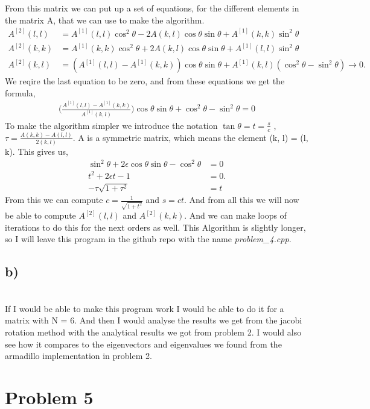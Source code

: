 \documentclass[english,notitlepage]{revtex4-1}  %
\begin{document}
From this matrix we can put up a set of equations, for the different elements in the matrix A, that we can use to make the algorithm.
\begin{align}
A^{[2]}(l, l) &= A^{[1]}(l, l) \cos^2 \theta - 2 A(k, l) \cos \theta \sin \theta + A^{[1]}(k, k) \sin^2 \theta \\
A^{[2]}(k, k) &= A^{[1]}(k, k) \cos^2 \theta + 2 A(k, l) \cos \theta \sin \theta + A^{[1]}(l, l) \sin^2 \theta \\
A^{[2]}(k, l) &= (A^{[1]}(l, l) - A^{[1]}(k, k))\cos \theta \sin \theta + A^{[1]}(k, l)(\cos^2 \theta - \sin^2 \theta) \rightarrow 0.
\end{align}
We reqire the last equation to be zero, and from these equations we get the formula, 
\begin{align}
\bigg( \frac{A^{[1]}(l, l) - A^{[1]}(k, k)}{A^{[1]}(k, l)} \bigg)\cos \theta \sin \theta + \cos^2 \theta - \sin^2 \theta = 0
\end{align}
To make the algorithm simpler we introduce the notation $\tan \theta = t = \frac{s}{c}$ , $\tau = \frac{A(k, k) - A(l, l)}{2(k, l)}$. A is a symmetric matrix, which means the element (k, l) = (l, k). This gives us, 
\begin{align}
\sin^2 \theta + 2\epsilon \cos \theta \sin \theta - \cos^2 \theta &= 0 \\
t^2 + 2\epsilon t - 1 &= 0.\\
 -\tau \sqrt{1 + \tau^2} &= t
\end{align}
From this we can compute $c = \frac{1}{\sqrt{1 + t^2}}$ and $s = ct$. And from all this we will now be able to compute $A^{[2]}(l, l)$ and $A^{[2]}(k, k)$. And we can make loops of iterations to do this for the next orders as well. This Algorithm is slightly longer, so I will leave this program in the github repo with the name \textit{problem\_4.cpp}. 


\subsection*{b)}\
\\
If I would be able to make this program work I would be able to do it for a matrix with N = 6. And then I would analyse the results we get from the jacobi rotation method with the analytical results we got from problem 2. I would also see how it compares to the eigenvectors and eigenvalues we found from the armadillo implementation in problem 2. 




\section*{Problem 5}
\end{document}
